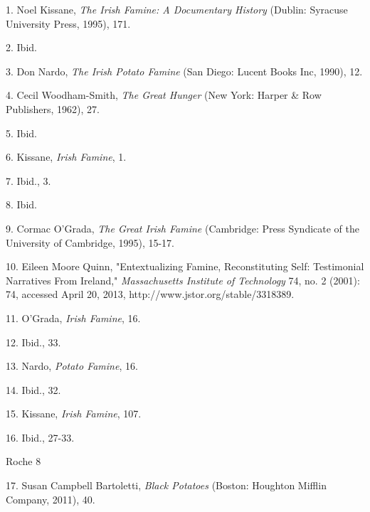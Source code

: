 \begin{Spacing}{1.5}
\hspace{.4in}1. Noel Kissane, \emph{The Irish Famine: A Documentary History} (Dublin: Syracuse University Press, 1995), 171.

\hspace{.4in}2. Ibid.

\hspace{.4in}3. Don Nardo, \emph{The Irish Potato Famine} (San Diego: Lucent Books Inc, 1990), 12.

\hspace{.4in}4. Cecil Woodham-Smith, \emph{The Great Hunger} (New York: Harper \& Row Publishers, 1962), 27.

\hspace{.4in}5. Ibid.

\hspace{.4in}6. Kissane, \emph{Irish Famine}, 1.

\hspace{.4in}7. Ibid., 3.

\hspace{.4in}8. Ibid.

\hspace{.4in}9. Cormac O’Grada, \emph{The Great Irish Famine} (Cambridge: Press Syndicate of the University of
Cambridge, 1995), 15-17.

\hspace{.4in}10. Eileen Moore Quinn, "Entextualizing Famine, Reconstituting Self: Testimonial Narratives
From Ireland," \emph{Massachusetts Institute of Technology} 74, no. 2 (2001): 74, accessed April 20,
2013, http://www.jstor.org/stable/3318389.

\hspace{.4in}11. O'Grada, \emph{Irish Famine}, 16.

\hspace{.4in}12. Ibid., 33.

\hspace{.4in}13. Nardo, \emph{Potato Famine}, 16.

\hspace{.4in}14. Ibid., 32.

\hspace{.4in}15. Kissane, \emph{Irish Famine}, 107.

\hspace{.4in}16. Ibid., 27-33.

\newpage
\thispagestyle{empty}
\begin{flushright}Roche 8 \end{flushright}

\hspace{.4in}17. Susan Campbell Bartoletti, \emph{Black Potatoes} (Boston: Houghton Mifflin Company, 2011), 40.


\end{Spacing}

